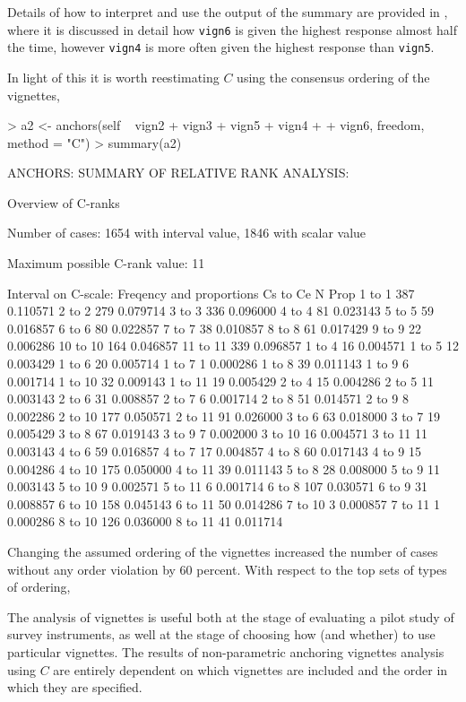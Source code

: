 \documentclass{amsart}
\newcommand{\code}[1]{{\texttt{#1}}}
\begin{document}
Details of how to interpret and use the output of the summary are
provided in \cite{wand.ea:2007}, where it is discussed in detail how
\code{vign6} is given the highest response almost half the
time, however \code{vign4} is more often given the highest response
than \code{vign5}.  

In light of this it is worth reestimating $C$ using the consensus
ordering of the vignettes,
\begin{Schunk}
\begin{Sinput}
> a2 <- anchors(self ~ vign2 + vign3 + vign5 + vign4 + 
+     vign6, freedom, method = "C")
> summary(a2)
\end{Sinput}
\begin{Soutput}
ANCHORS: SUMMARY OF RELATIVE RANK ANALYSIS:

Overview of C-ranks

Number of cases: 1654 with interval value, 1846 with scalar value

Maximum possible C-rank value: 11

Interval on C-scale: Freqency and proportions Cs to Ce
           N     Prop
 1 to  1 387 0.110571
 2 to  2 279 0.079714
 3 to  3 336 0.096000
 4 to  4  81 0.023143
 5 to  5  59 0.016857
 6 to  6  80 0.022857
 7 to  7  38 0.010857
 8 to  8  61 0.017429
 9 to  9  22 0.006286
10 to 10 164 0.046857
11 to 11 339 0.096857
 1 to  4  16 0.004571
 1 to  5  12 0.003429
 1 to  6  20 0.005714
 1 to  7   1 0.000286
 1 to  8  39 0.011143
 1 to  9   6 0.001714
 1 to 10  32 0.009143
 1 to 11  19 0.005429
 2 to  4  15 0.004286
 2 to  5  11 0.003143
 2 to  6  31 0.008857
 2 to  7   6 0.001714
 2 to  8  51 0.014571
 2 to  9   8 0.002286
 2 to 10 177 0.050571
 2 to 11  91 0.026000
 3 to  6  63 0.018000
 3 to  7  19 0.005429
 3 to  8  67 0.019143
 3 to  9   7 0.002000
 3 to 10  16 0.004571
 3 to 11  11 0.003143
 4 to  6  59 0.016857
 4 to  7  17 0.004857
 4 to  8  60 0.017143
 4 to  9  15 0.004286
 4 to 10 175 0.050000
 4 to 11  39 0.011143
 5 to  8  28 0.008000
 5 to  9  11 0.003143
 5 to 10   9 0.002571
 5 to 11   6 0.001714
 6 to  8 107 0.030571
 6 to  9  31 0.008857
 6 to 10 158 0.045143
 6 to 11  50 0.014286
 7 to 10   3 0.000857
 7 to 11   1 0.000286
 8 to 10 126 0.036000
 8 to 11  41 0.011714
\end{Soutput}
\end{Schunk}
Changing the assumed ordering of the vignettes increased the number of
cases without any order violation by 60 percent.  With respect to the
top sets of types of ordering,

The analysis of vignettes is useful both at the stage of evaluating a
pilot study of survey instruments, as well at the stage of choosing
how (and whether) to use particular vignettes.  The results of
non-parametric anchoring vignettes analysis using $C$ are entirely
dependent on which vignettes are included and the order in which they
are specified.
\end{document}
